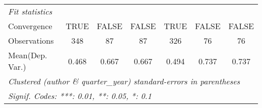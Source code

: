 \begin{tabular}{lcccccc}
   \midrule
   \emph{Fit statistics}\\
   Convergence             &TRUE     & FALSE         & FALSE            & TRUE         & FALSE       & FALSE\\  
   Observations            & 348     & 87            & 87               & 326          & 76          & 76\\  
Mean(Dep. Var.) & 0.468 & 0.667 & 0.667 & 0.494 & 0.737 & 0.737 \\
   \midrule \midrule
   \multicolumn{7}{l}{\emph{Clustered (author \& quarter\_year) standard-errors in parentheses}}\\
   \multicolumn{7}{l}{\emph{Signif. Codes: ***: 0.01, **: 0.05, *: 0.1}}\\
\end{tabular}
\par\endgroup
